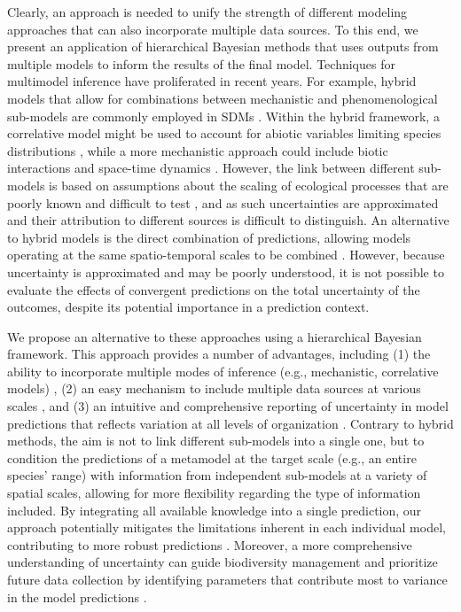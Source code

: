\documentclass[11pt]{article}
\begin{document}
Clearly, an approach is needed to unify the strength of different modeling approaches that can also incorporate multiple data sources.
To this end, we present an application of hierarchical Bayesian methods that uses outputs from multiple models to inform the results of the final model.
Techniques for multimodel inference have proliferated in recent years.
For example, hybrid models that allow for combinations between mechanistic and phenomenological sub-models are commonly employed in SDMs \citep{Gallien2010, Thuiller2013, Boulangeat2014}.
Within the hybrid framework, a correlative model might be used to account for abiotic variables limiting species distributions \citep{Guisan2005}, while a more mechanistic approach could include biotic interactions and space-time dynamics \citep{Smolik2010}.
However, the link between different sub-models is based on assumptions about the scaling of ecological processes that are poorly known and difficult to test \citep{Gallien2010}, and as such uncertainties are approximated and their attribution to different sources is difficult to distinguish.
An alternative to hybrid models is the direct combination of predictions, allowing models operating at the same spatio-temporal scales to be combined \citep[e.g., model averaging, ensemble forecasting;][]{Araujo2007}. 
However, because uncertainty is approximated and may be poorly understood, it is not possible to evaluate the effects of convergent predictions on the total uncertainty of the outcomes, despite its potential importance in a prediction context.

We propose an alternative to these approaches using a hierarchical Bayesian framework. 
This approach provides a number of advantages, including (1) the ability to incorporate multiple modes of inference (e.g., mechanistic, correlative models) \citep{VanOijen2005, Clark2006, Hobbs2011, Hartig2012}, (2) an easy mechanism to include multiple data sources at various scales \citep{Levin1992, Peters2004}, and (3) an intuitive and comprehensive reporting of uncertainty in model predictions that reflects variation at all levels of organization \citep{Cressie2009, Hobbs2011}.
Contrary to hybrid methods, the aim is not to link different sub-models into a single one, but to condition the predictions of a metamodel at the target scale (e.g., an entire species' range) with information from independent sub-models at a variety of spatial scales, allowing for more flexibility regarding the type of information included. 
By integrating all available knowledge into a single prediction, our approach potentially mitigates the limitations inherent in each individual model, contributing to more robust predictions \citep{Guisan2005, Araujo2006}.
Moreover, a more comprehensive understanding of uncertainty can guide biodiversity management and prioritize future data collection by identifying parameters that contribute most to variance in the model predictions \citep{McMahon2011}. 
\end{document}
